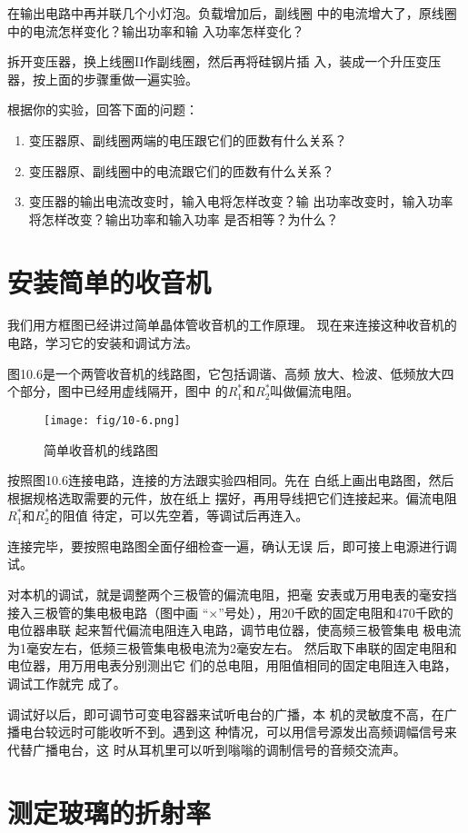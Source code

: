在输出电路中再并联几个小灯泡。负载增加后，副线圈
中的电流增大了，原线圈中的电流怎样变化？输出功率和输
入功率怎样变化？

拆开变压器，换上线圈II作副线圈，然后再将硅钢片插
入，装成一个升压变压器，按上面的步骤重做一遍实验。

根据你的实验，回答下面的问题：
\begin{enumerate}
    \item 变压器原、副线圈两端的电压跟它们的匝数有什么关系？
    \item 变压器原、副线圈中的电流跟它们的匝数有什么关系？
    \item 变压器的输出电流改变时，输入电将怎样改变？输
出功率改变时，输入功率将怎样改变？输出功率和输入功率
是否相等？为什么？
\end{enumerate}

\section{安装简单的收音机}
我们用方框图已经讲过简单晶体管收音机的工作原理。
现在来连接这种收音机的电路，学习它的安装和调试方法。

图10.6是一个两管收音机的线路图，它包括调谐、高频
放大、检波、低频放大四个部分，图中已经用虚线隔开，图中
的$R_1^*$和$R_2^*$叫做偏流电阻。
\begin{figure}[htp]\centering
    \texttt{[image: fig/10-6.png]}
    \caption{简单收音机的线路图}
    \end{figure}

按照图10.6连接电路，连接的方法跟实验四相同。先在
白纸上画出电路图，然后根据规格选取需要的元件，放在纸上
摆好，再用导线把它们连接起来。偏流电阻$R_1^*$和$R_2^*$的阻值
待定，可以先空着，等调试后再连入。

连接完毕，要按照电路图全面仔细检查一遍，确认无误
后，即可接上电源进行调试。

对本机的调试，就是调整两个三极管的偏流电阻，把毫
安表或万用电表的毫安挡接入三极管的集电极电路（图中画
“$\times$”号处），用20千欧的固定电阻和470千欧的电位器串联
起来暂代偏流电阻连入电路，调节电位器，使高频三极管集电
极电流为1毫安左右，低频三极管集电极电流为2毫安左右。
然后取下串联的固定电阻和电位器，用万用电表分别测出它
们的总电阻，用阻值相同的固定电阻连入电路，调试工作就完
成了。

调试好以后，即可调节可变电容器来试听电台的广播，本
机的灵敏度不高，在广播电台较远时可能收听不到。遇到这
种情况，可以用信号源发出高频调幅信号来代替广播电台，这
时从耳机里可以听到嗡嗡的调制信号的音频交流声。

\section{测定玻璃的折射率}

